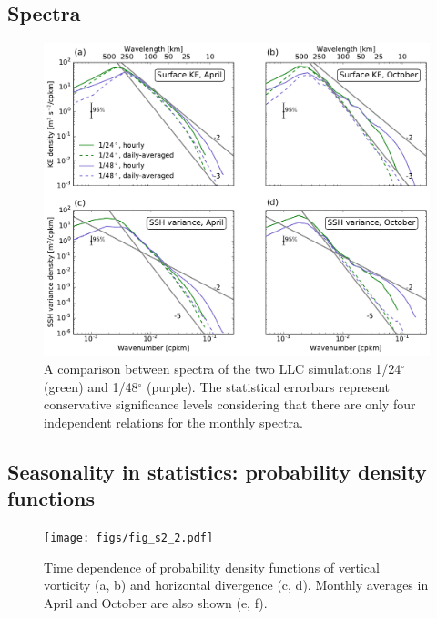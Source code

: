 \documentclass[grl]{agutex2015}
\begin{document}
\begin{article}
\subsection{Spectra}

\begin{figure}[ht]
   \begin{center}
     \includegraphics[width=1.\textwidth]{figs/fig_s2_3.pdf}
  \caption{A comparison between spectra of the two LLC simulations 1/24$^\circ$
  (green) and 1/48$^\circ$ (purple). The statistical errorbars represent conservative
  significance levels considering that there are only four independent relations
  for the monthly spectra.}
  \label{figS2_3}
  \end{center}
\end{figure}

\subsection{Seasonality in statistics: probability density functions}
\begin{figure}[ht]
   \begin{center}
     \texttt{[image: figs/fig\_s2\_2.pdf]}
  \caption{Time dependence of probability density functions of vertical vorticity (a, b)
  and horizontal divergence (c, d). Monthly averages in April and October are
  also shown (e, f).}
  \label{figS2_2}
  \end{center}
\end{figure}


\end{article}
\end{document}
